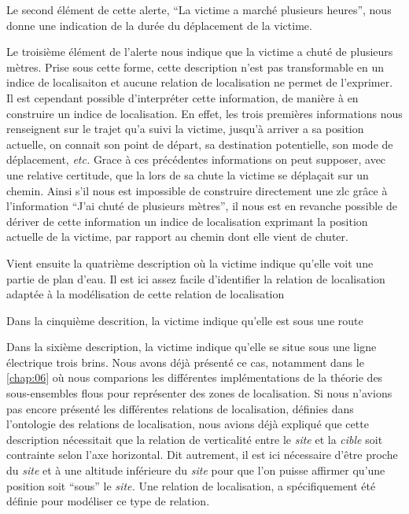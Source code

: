 Le second élément de cette alerte, \enquote{La victime a marché
  plusieurs heures}, nous donne une indication de la durée du
déplacement de la victime. 


Le troisième élément de l'alerte nous indique que la victime a chuté
de plusieurs mètres. Prise sous cette forme, cette description n'est
pas transformable en un indice de localisaiton et aucune relation de
localisation ne permet de l'exprimer. Il est cependant possible
d'interpréter cette information, de manière à en construire un indice
de localisation. En effet, les trois premières informations nous
renseignent sur le trajet qu'a suivi la victime, jusqu'à arriver a sa
position actuelle, on connait son point de départ, sa destination
potentielle, son mode de déplacement, \emph{etc.} Grace à ces
précédentes informations on peut supposer, avec une relative
certitude, que la lors de sa chute la victime se déplaçait sur un
chemin. Ainsi s'il nous est impossible de construire directement une
\ac{zlc} grâce à l'information \enquote{J'ai chuté de plusieurs
  mètres}, il nous est en revanche possible de dériver de cette
information un indice de localisation exprimant la position actuelle
de la victime, par rapport au chemin dont elle vient de chuter.



Vient ensuite la quatrième description où la victime indique qu'elle
voit une partie de plan d'eau.
%
Il est ici assez facile d’identifier la relation de localisation
adaptée à la modélisation de cette relation de localisation



Dans la cinquième descrition, la victime indique qu'elle est sous une
route


Dans la sixième description, la victime indique qu'elle se situe sous
une ligne électrique trois brins.
%
Nous avons déjà présenté ce cas, notamment dans le \autoref{chap:06}
où nous comparions les différentes implémentations de la théorie des
sous-ensembles flous pour représenter des zones de localisation. Si
nous n'avions pas encore présenté les différentes relations de
localisation, définies dans l'ontologie des relations de localisation,
nous avions déjà expliqué que cette description nécessitait que la
relation de verticalité entre le \emph{site} et la \emph{cible} soit
contrainte selon l'axe horizontal. Dit autrement, il est ici
nécessaire d'être proche du \emph{site} et à une altitude inférieure
du \emph{site} pour que l'on puisse affirmer qu'une position soit
\enquote{sous} le \emph{site.} Une relation de localisation,
 a spécifiquement été définie pour modéliser ce
type de relation.


